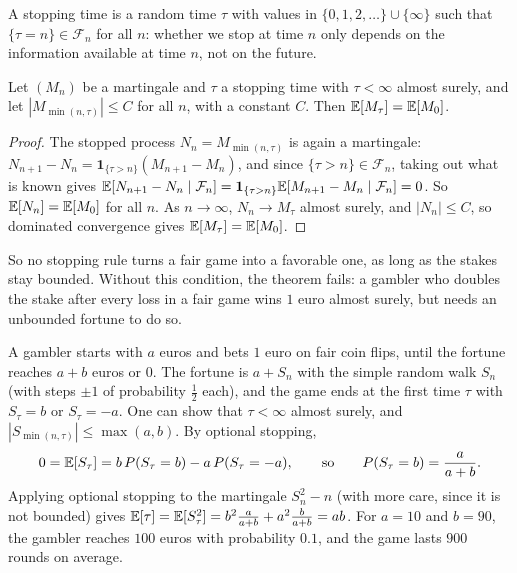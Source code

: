 A stopping time is a random time $\tau$ with values in $\{0, 1, 2, \ldots\} \cup \{\infty\}$ such that $\{\tau = n\} \in \mathcal{F}_n$ for all $n$: whether we stop at time $n$ only depends on the information available at time $n$, not on the future.

\begin{theorem}\label{B-thm:optional-stopping}
    Let $(M_n)$ be a martingale and $\tau$ a stopping time with $\tau < \infty$ almost surely, and let $|M_{\min(n, \tau)}| \leq C$ for all $n$, with a constant $C$. Then $\mathbb{E}[M_\tau] = \mathbb{E}[M_0]$.
\end{theorem}

\begin{proof}
    The stopped process $N_n = M_{\min(n, \tau)}$ is again a martingale: $N_{n+1} - N_n = \mathbf{1}_{\{\tau > n\}}(M_{n+1} - M_n)$, and since $\{\tau > n\} \in \mathcal{F}_n$, taking out what is known gives $\mathbb{E}[N_{n+1} - N_n \mid \mathcal{F}_n] = \mathbf{1}_{\{\tau > n\}}\mathbb{E}[M_{n+1} - M_n \mid \mathcal{F}_n] = 0$. So $\mathbb{E}[N_n] = \mathbb{E}[M_0]$ for all $n$. As $n \to \infty$, $N_n \to M_\tau$ almost surely, and $|N_n| \leq C$, so dominated convergence gives $\mathbb{E}[M_\tau] = \mathbb{E}[M_0]$.
\end{proof}

So no stopping rule turns a fair game into a favorable one, as long as the stakes stay bounded. Without this condition, the theorem fails: a gambler who doubles the stake after every loss in a fair game wins $1$ euro almost surely, but needs an unbounded fortune to do so.

\begin{example}\label{B-ex:gamblers-ruin}
    A gambler starts with $a$ euros and bets $1$ euro on fair coin flips, until the fortune reaches $a + b$ euros or $0$. The fortune is $a + S_n$ with the simple random walk $S_n$ (with steps $\pm 1$ of probability $\frac{1}{2}$ each), and the game ends at the first time $\tau$ with $S_\tau = b$ or $S_\tau = -a$. One can show that $\tau < \infty$ almost surely, and $|S_{\min(n, \tau)}| \leq \max(a, b)$. By optional stopping,
    \[0 = \mathbb{E}[S_\tau] = b\,P(S_\tau = b) - a\,P(S_\tau = -a), \qquad \text{so} \qquad P(S_\tau = b) = \frac{a}{a + b}.\]
    Applying optional stopping to the martingale $S_n^2 - n$ (with more care, since it is not bounded) gives $\mathbb{E}[\tau] = \mathbb{E}[S_\tau^2] = b^2\frac{a}{a + b} + a^2\frac{b}{a + b} = ab$. For $a = 10$ and $b = 90$, the gambler reaches $100$ euros with probability $0.1$, and the game lasts $900$ rounds on average.
\end{example}

